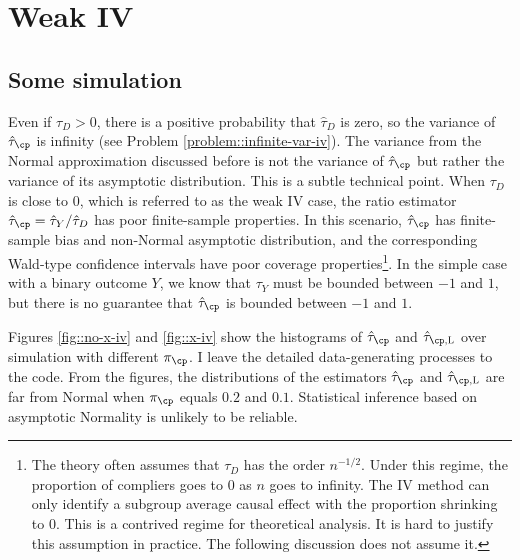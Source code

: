 \section{Weak IV}

\subsection{Some simulation}
 
Even if $\tau_D >0$, there is a positive probability that $\hat{\tau}_D$ is zero, so the variance of $\hat{\tau}_\cp$ is infinity (see Problem \ref{problem::infinite-var-iv}). The variance from the Normal approximation discussed before is not the variance of  $\hat{\tau}_\cp$ but rather the variance of its asymptotic distribution. This is a subtle technical point.  When $ \tau_D$ is close to $0$, which is referred to as the weak IV case, the ratio estimator $\hat{\tau}_\cp = \hat{\tau}_Y / \hat{\tau}_D$ has poor finite-sample properties.  In this scenario, $\hat{\tau}_\cp$ has finite-sample bias and non-Normal asymptotic distribution, and the corresponding Wald-type confidence intervals have poor coverage properties\footnote{The theory often assumes that $\tau_D$ has the order $n^{-1/2}$. Under this regime, the proportion of compliers goes to 0 as $n$ goes to infinity. The IV method can only identify a subgroup average causal effect with the proportion shrinking to 0.  This is a contrived regime for theoretical analysis. It is hard to justify this assumption in practice. The following discussion does not assume it.}. In the simple case with a binary outcome $Y$, we know that $\tau_Y$ must be bounded between $-1$ and $1$, but there is no guarantee that $\hat{\tau}_\cp$ is bounded between $-1$ and $1$. 
 

Figures \ref{fig::no-x-iv} and \ref{fig::x-iv} show the histograms of $\hat{\tau}_\cp$ and $\hat{\tau}_{\cp, \textsc{L}}$ over simulation with different $\pi_\cp$. I leave the detailed data-generating processes to the  code. From the figures, the distributions of the estimators $\hat{\tau}_\cp$ and $\hat{\tau}_{\cp, \textsc{L}}$ are far from Normal when $\pi_\cp$ equals $0.2$ and $0.1$. Statistical inference based on asymptotic Normality is unlikely to be reliable. 

